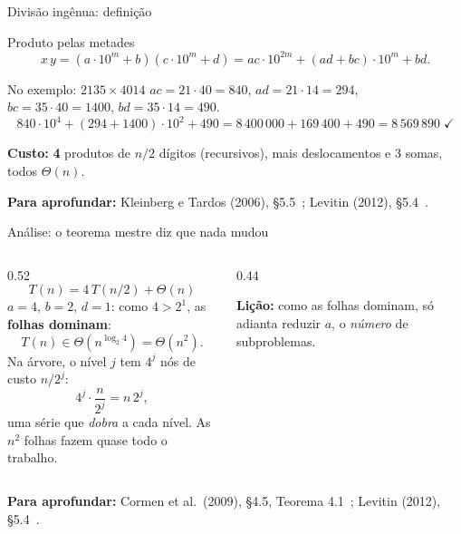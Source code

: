 \documentclass[aspectratio=169,xcolor=table]{beamer}
\newcommand{\fonte}[1]{%
  \vfill
  {\tiny\color{gray!55!black}\textbf{Para aprofundar:} #1\par}%
}
\begin{document}
\begin{frame}{Divisão ingênua: definição}
  \begin{block}{Produto pelas metades}
    \scriptsize
    \[
      x\,y = (a\cdot 10^m + b)(c\cdot 10^m + d)
          = ac\cdot 10^{2m} + (ad + bc)\cdot 10^m + bd.
    \]
  \end{block}
  \begin{exampleblock}{No exemplo: $2135\times 4014$}
    \scriptsize
    $ac = 21\cdot 40 = 840$, \quad $ad = 21\cdot 14 = 294$, \quad
    $bc = 35\cdot 40 = 1400$, \quad $bd = 35\cdot 14 = 490$.
    \[ 840\cdot 10^4 + (294+1400)\cdot 10^2 + 490 = 8\,400\,000 + 169\,400 + 490
       = 8\,569\,890 \;\checkmark \]
  \end{exampleblock}
  \scriptsize\textbf{Custo:} \textbf{4} produtos de $n/2$ dígitos (recursivos), mais deslocamentos
  e 3 somas, todos $\Theta(n)$.
  \fonte{Kleinberg e Tardos (2006), \S 5.5~\cite{kleinberg2006algorithm};
    Levitin (2012), \S 5.4~\cite{levitin2012introduction}.}
\end{frame}

\begin{frame}{Análise: o teorema mestre diz que nada mudou}
  \begin{columns}[c]
    \begin{column}{0.52\textwidth}
      \scriptsize
      \[ T(n) = 4\,T(n/2) + \Theta(n) \]
      $a=4$, $b=2$, $d=1$: como $4 > 2^1$, as \textbf{folhas dominam}:
      \[ T(n)\in\Theta(n^{\log_2 4}) = \Theta(n^2). \]
      Na árvore, o nível $j$ tem $4^j$ nós de custo $n/2^j$:
      \[ 4^j\cdot\frac{n}{2^j} = n\,2^j, \]
      uma série que \emph{dobra} a cada nível. As $n^2$ folhas fazem quase todo o trabalho.
    \end{column}
    \begin{column}{0.44\textwidth}
      \centering
      \medskip

      \scriptsize\textbf{Lição:} como as folhas dominam, só adianta reduzir $a$, o
      \emph{número} de subproblemas.
    \end{column}
  \end{columns}
  \fonte{Cormen et al.\ (2009), \S 4.5, Teorema 4.1~\cite{cormen2009introduction};
    Levitin (2012), \S 5.4~\cite{levitin2012introduction}.}
\end{frame}
\end{document}
